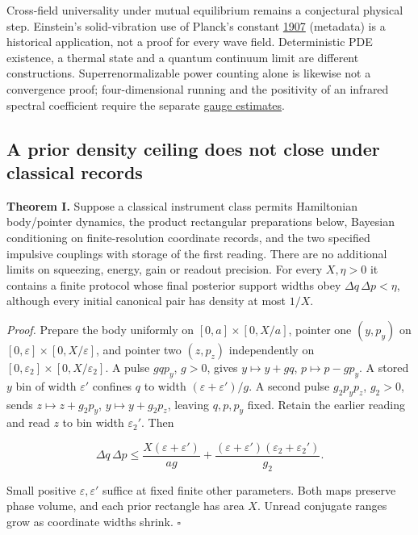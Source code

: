 \documentclass[11pt,a4paper]{article}
\begin{document}
Cross-field universality under mutual equilibrium remains a conjectural
physical step. Einstein's solid-vibration use of Planck's constant
\href{https://doi.org/10.1002/andp.19063270110}{1907} (metadata) is a
historical application, not a proof for every wave field. Deterministic
PDE existence, a thermal state and a quantum continuum limit are
different constructions. Superrenormalizable power counting alone is
likewise not a convergence proof; four-dimensional running and the
positivity of an infrared spectral coefficient require the separate
\href{halving-atlas.md}{gauge estimates}.

\hypertarget{a-prior-density-ceiling-does-not-close-under-classical-records}{%
\subsection{A prior density ceiling does not close under classical
records}\label{a-prior-density-ceiling-does-not-close-under-classical-records}}

\textbf{Theorem I.} Suppose a classical instrument class permits
Hamiltonian body/pointer dynamics, the product rectangular preparations
below, Bayesian conditioning on finite-resolution coordinate records,
and the two specified impulsive couplings with storage of the first
reading. There are no additional limits on squeezing, energy, gain or
readout precision. For every \(X,\eta>0\) it contains a finite protocol
whose final posterior support widths obey \(\Delta q\,\Delta p<\eta\),
although every initial canonical pair has density at most \(1/X\).

\emph{Proof.} Prepare the body uniformly on \([0,a]\times[0,X/a]\),
pointer one \((y,p_y)\) on \([0,\varepsilon]\times[0,X/\varepsilon]\),
and pointer two \((z,p_z)\) independently on
\([0,\varepsilon_2]\times[0,X/\varepsilon_2]\). A pulse \(gqp_y\),
\(g>0\), gives \(y\mapsto y+gq\), \(p\mapsto p-gp_y\). A stored \(y\)
bin of width \(\varepsilon'\) confines \(q\) to width
\((\varepsilon+\varepsilon')/g\). A second pulse \(g_2p_yp_z\),
\(g_2>0\), sends \(z\mapsto z+g_2p_y\), \(y\mapsto y+g_2p_z\), leaving
\(q,p,p_y\) fixed. Retain the earlier reading and read \(z\) to bin
width \(\varepsilon_2'\). Then

\[\Delta q\,\Delta p\le
 \frac{X(\varepsilon+\varepsilon')}{ag}
 +\frac{(\varepsilon+\varepsilon')(\varepsilon_2+\varepsilon_2')}{g_2}.\]

Small positive \(\varepsilon,\varepsilon'\) suffice at fixed finite
other parameters. Both maps preserve phase volume, and each prior
rectangle has area \(X\). Unread conjugate ranges grow as coordinate
widths shrink. \(\square\)
\end{document}
